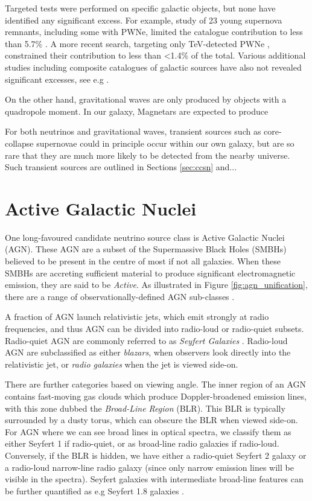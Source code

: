 Targeted tests were performed on specific galactic objects, but none have identified any significant excess. For example,  study of 23 young supernova remnants, including some with PWNe, limited the catalogue contribution to less than 5.7\% \cite{ic_17_galactic}. A more recent search, targeting only TeV-detected PWNe , constrained their contribution to less than <1.4\% of the total. Various additional studies including composite catalogues of galactic sources have also not revealed significant excesses, see e.g .

On the other hand, gravitational waves are only produced by objects with a quadropole moment. In our galaxy, Magnetars are expected to produce  

For both neutrinos and gravitational waves, transient sources such as core-collapse supernovae could in principle occur within our own galaxy, but are so rare that they are much more likely to be detected from the nearby universe. Such transient sources are outlined in Sections \ref{sec:ccsn} and... 

\section{Active Galactic Nuclei}
\label{sec:agn}

One long-favoured candidate neutrino source class is Active Galactic Nuclei (AGN). These AGN are a subset of the Supermassive Black Holes (SMBHs) believed to be present in the centre of most if not all galaxies. When these SMBHs are  accreting sufficient material to produce significant electromagnetic emission, they are said to be \emph{Active}. As illustrated in Figure \ref{fig:agn_unification}, there are a range of observationally-defined AGN sub-classes . 

A fraction of AGN launch relativistic jets, which emit strongly at radio frequencies, and thus AGN can be divided into radio-loud or radio-quiet subsets. Radio-quiet AGN are commonly referred to as \emph{Seyfert Galaxies} . Radio-loud AGN are subclassified as either \emph{blazars}, when observers look directly into the relativistic jet, or \emph{radio galaxies} when the jet is viewed side-on.

There are further categories based on viewing angle. The inner region of an AGN contains fast-moving gas clouds which produce Doppler-broadened emission lines, with this zone dubbed the \emph{Broad-Line Region} (BLR). This BLR is typically surrounded by a dusty torus, which can obscure the BLR when viewed side-on. For AGN where we can see broad lines in optical spectra, we classify them as either Seyfert 1 if radio-quiet, or as broad-line radio galaxies if radio-loud. Conversely, if the BLR is hidden, we have either a radio-quiet Seyfert 2 galaxy or a radio-loud narrow-line radio galaxy (since only narrow emission lines will be visible in the spectra). Seyfert galaxies with intermediate broad-line features can be further quantified as e.g Seyfert 1.8 galaxies .

